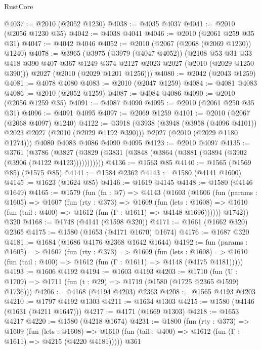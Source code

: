 \begin{lexlean}{RustCore}
\begin{coremodule}
@4037 := @2010 (@2052 @1230)
@4038 := @4035 @4037
@4041 := @2010 (@2056 @1230 @35)
@4042 := @4038 @4041
@4046 := @2010 (@2061 @259 @35 @31)
@4047 := @4042 @4046
@4052 := @2010 (@2067 (@2068 (@2069 @1230)) @1240)
@4078 := @3965
    (@3975
      (@3979 (@4047 @4052))
      (@2108
        @53
        @31
        @33
        @418
        @390
        @407
        @367
        @1249
        @374
        @2127
        @2023
        @2027
        (@2010 (@2029 @1250 @390)))
      @2027
      (@2010 (@2029 @1201 @1256)))
@4080 := @2042 (@2043 @1259)
@4081 := @4078 @4080
@4083 := @2010 (@2047 @1259)
@4084 := @4081 @4083
@4086 := @2010 (@2052 @1259)
@4087 := @4084 @4086
@4090 := @2010 (@2056 @1259 @35)
@4091 := @4087 @4090
@4095 := @2010 (@2061 @250 @35 @31)
@4096 := @4091 @4095
@4097 := @2069 @1259
@4101 := @2010 (@2067 (@2068 @4097) @1240)
@4122 := @3918
    (@3938
      (@3948 (@3958 (@4096 @4101)) @2023 @2027 (@2010 (@2029 @1192 @390)))
      @2027
      (@2010 (@2029 @1180 @1274)))
    @4080
    @4083
    @4086
    @4090
    @4095
@4123 := @2010 @4097
@4135 := @3761
    (@3786 (@3827 (@3829 (@3831 (@3848 (@3864 (@3881 (@3894 (@3902 (@3906 (@4122 @4123)))))))))))
@4136 := @1563 @85
@4140 := @1565 (@1569 @85) (@1575 @85)
@4141 := @1584 @2362
@4143 := @1580 (@4141 @1600)
@4145 := @1623 (@1624 @85)
@4146 := @1619 @4145
@4148 := @1580 (@4146 @1649)
@4165 := @1579
    (fun (fn : @7) =>
    @4143
      (@1603
        (@1606
          (fun (params : @1605) =>
          @1607
            (fun (rty : @373) =>
            @1609
              (fun (lets : @1608) =>
              @1610 (fun (tail : @400) => @1612 (fun (Γ : @1611) => @4148 @1696))))))
        @1742))
    @320
@4168 := @1748 (@4141 (@1598 @320))
@4171 := @1661 (@1662 @320) @2365
@4175 := @1580 (@1653 (@4171 @1670) @1674)
@4176 := @1687 @320
@4181 := @1684 (@1686 @4176 @2368 @1642 @1644)
@4192 := fun (params : @1605) =>
  @1607
    (fun (rty : @373) =>
    @1609
      (fun (lets : @1608) =>
      @1610 (fun (tail : @400) => @1612 (fun (Γ : @1611) => @4148 (@4175 @4181)))))
@4193 := @1606 @4192
@4194 := @1603 @4193
@4203 := @1710 (fun (U : @1709) => @1711 (fun (t : @29) => @1719 (@1580 (@1725 @2365 @1599) @1736)))
@4206 := @4168 (@4194 @4203) @2363
@4208 := @1565 @4193 @4203
@4210 := @1797 @4192 @1303
@4211 := @1634 @1303
@4215 := @1580 (@4146 (@1631 (@4211 @1647)))
@4217 := @4171 (@1669 @1303)
@4218 := @1653 @4217
@4220 := @1580 (@4218 @1674)
@4231 := @1800
    (fun (rty : @373) =>
    @1609
      (fun (lets : @1608) =>
      @1610 (fun (tail : @400) => @1612 (fun (Γ : @1611) => @4215 (@4220 @4181)))))
    @361

\end{coremodule}
\end{lexlean}
